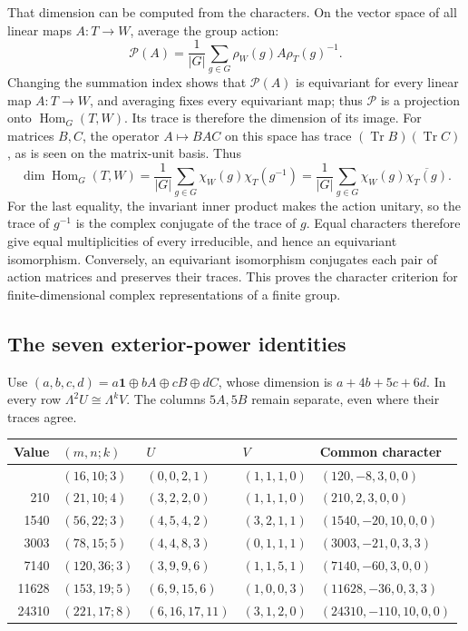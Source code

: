 \documentclass[11pt,a4paper]{article}
\begin{document}
That dimension can be computed from the characters. On the vector space of all linear maps \(A:T\to W\), average the group action:
\[
\mathcal P(A)=\frac1{|G|}\sum_{g\in G}
       \rho_W(g)A\rho_T(g)^{-1}.
\]
Changing the summation index shows that \(\mathcal P(A)\) is equivariant for every linear map \(A:T\to W\), and averaging fixes every equivariant map; thus \(\mathcal P\) is a projection onto \(\operatorname{Hom}_G(T,W)\). Its trace is therefore the dimension of its image. For matrices \(B,C\), the operator \(A\mapsto BAC\) on this space has trace \((\operatorname{Tr}B)(\operatorname{Tr}C)\), as is seen on the matrix-unit basis. Thus
\[
\dim\operatorname{Hom}_G(T,W)
=\frac1{|G|}\sum_{g\in G}\chi_W(g)\chi_T(g^{-1})
=\frac1{|G|}\sum_{g\in G}\chi_W(g)\overline{\chi_T(g)}.
\]
For the last equality, the invariant inner product makes the action unitary, so the trace of \(g^{-1}\) is the complex conjugate of the trace of \(g\). Equal characters therefore give equal multiplicities of every irreducible, and hence an equivariant isomorphism. Conversely, an equivariant isomorphism conjugates each pair of action matrices and preserves their traces. This proves the character criterion for finite-dimensional complex representations of a finite group.

\subsection{The seven exterior-power identities}\label{subsec:A2}

Use \((a,b,c,d)=a\mathbf1\oplus bA\oplus cB\oplus dC\), whose dimension is \(a+4b+5c+6d\). In every row \(\Lambda^2U\cong\Lambda^kV\). The columns \(5A,5B\) remain separate, even where their traces agree.

{\small
\begin{longtable}[]{@{}rllll@{}}
\toprule\noalign{}
Value & \((m,n;k)\) & \(U\) & \(V\) & Common character \\
\midrule\noalign{}
\endhead
\bottomrule\noalign{}
\endlastfoot
120 & \((16,10;3)\) & \((0,0,2,1)\) & \((1,1,1,0)\) & \((120,-8,3,0,0)\) \\
210 & \((21,10;4)\) & \((3,2,2,0)\) & \((1,1,1,0)\) & \((210,2,3,0,0)\) \\
1540 & \((56,22;3)\) & \((4,5,4,2)\) & \((3,2,1,1)\) & \((1540,-20,10,0,0)\) \\
3003 & \((78,15;5)\) & \((4,4,8,3)\) & \((0,1,1,1)\) & \((3003,-21,0,3,3)\) \\
7140 & \((120,36;3)\) & \((3,9,9,6)\) & \((1,1,5,1)\) & \((7140,-60,3,0,0)\) \\
11628 & \((153,19;5)\) & \((6,9,15,6)\) & \((1,0,0,3)\) & \((11628,-36,0,3,3)\) \\
24310 & \((221,17;8)\) & \((6,16,17,11)\) & \((3,1,2,0)\) & \((24310,-110,10,0,0)\) \\
\end{longtable}
}
\end{document}
